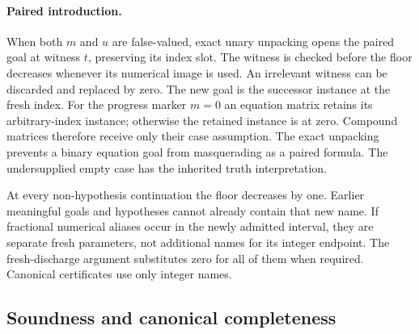\documentclass[11pt,letterpaper]{article}
\theoremstyle{definition}\newtheorem{definition}[theorem]{Definition}
\theoremstyle{remark}\newtheorem{remark}[theorem]{Remark}
\begin{document}
\paragraph{Paired introduction.}
When both $m$ and $u$ are false-valued, exact unary unpacking opens the
paired goal at witness $t$, preserving its index slot. The witness is
checked before the floor decreases whenever its numerical image is used.
An irrelevant witness can be discarded and replaced by zero.
The new goal is the successor
instance at the fresh index. For the progress marker $m=0$ an equation
matrix retains its arbitrary-index instance; otherwise the retained
instance is at zero. Compound matrices therefore receive only their
case assumption. The exact unpacking prevents a binary equation goal
from masquerading as a paired formula. The undersupplied empty case
has the inherited truth interpretation.

At every non-hypothesis continuation the floor decreases by one. Earlier
meaningful goals and hypotheses cannot already contain that new name.
If fractional numerical aliases occur in the newly admitted interval,
they are separate fresh parameters, not additional names for its integer
endpoint. The fresh-discharge argument substitutes zero for all of them
when required. Canonical certificates use only integer names.

\subsection{Soundness and canonical completeness}
\end{document}
